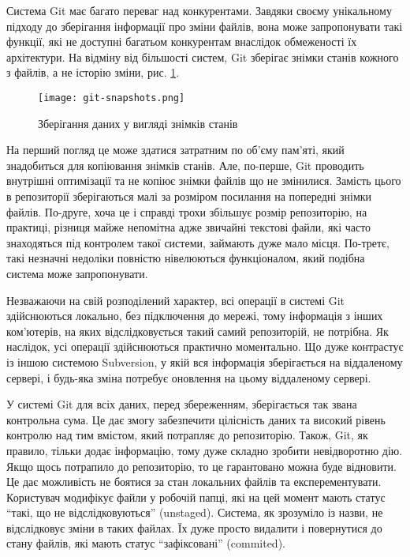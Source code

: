 Система Git має багато переваг над конкурентами. Завдяки своєму унікальному підходу
до зберігання інформації про зміни файлів, вона може запропонувати такі функції,
які не доступні багатьом конкурентам внаслідок обмеженості їх архітектури.
На відміну від більшості систем, Git зберігає знімки станів кожного з файлів, а не історію
зміни, рис. \ref{img:git_snapshots}.

\begin{figure}[h]
  \begin{center}
    \texttt{[image: git-snapshots.png]}
  \end{center}
  \caption{Зберігання даних у вигляді знімків станів}
  \label{img:git_snapshots}
\end{figure}

На перший погляд це може здатися затратним по об'єму пам'яті, який знадобиться для 
копіювання знімків станів. Але, по-перше,
Git проводить внутрішні оптимізації та не копіює знімки
файлів що не змінилися. Замість цього в репозиторії зберігаються малі за розміром посилання
на попередні знімки файлів. По-друге, хоча це і справді трохи збільшує розмір репозиторію,
на практиці, різниця майже непомітна адже звичайні текстові файли, які часто знаходяться
під контролем такої системи, займають дуже мало місця. По-третє, такі незначні недоліки
повністю нівелюються функціоналом, який подібна система може запропонувати.

Незважаючи на свій розподілений характер, всі операції в системі Git здійснюються локально,
без підключення до мережі, тому інформація з інших ком'ютерів, на яких відслідковується
такий самий репозиторій, не потрібна. Як наслідок, усі операції здійснюються практично
моментально. Що дуже контрастує із іншою системою Subversion, у якій вся інформація
зберігається на віддаленому сервері, і будь-яка зміна потребує оновлення на цьому
віддаленому сервері.

У системі Git для всіх даних, перед збереженням, зберігається так звана контрольна сума.
Це дає змогу забезпечити цілісність даних та високий рівень контролю над тим
вмістом, який потрапляє до репозиторію. Також, Git, як правило, тільки додає
інформацію, тому дуже складно зробити невідворотню дію. Якщо щось потрапило до
репозиторію, то це гарантовано можна буде відновити. Це дає можливість не боятися
за стан локальних файлів та експерементувати. Користувач модифікує файли у робочій папці,
які на цей момент мають статус ``такі, що не відслідковуються'' (unstaged). Система,
як зрозуміло із назви, не відслідковує зміни в таких файлах. Їх дуже просто видалити
і повернутися до стану файлів, які мають статус ``зафіксовані'' (commited).

